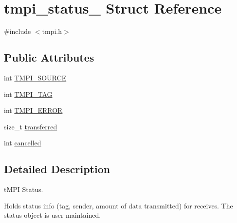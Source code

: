 \hypertarget{structtmpi__status__}{\section{tmpi\-\_\-status\-\_\- \-Struct \-Reference}
\label{structtmpi__status__}
}


{\ttfamily \#include $<$tmpi.\-h$>$}

\subsection*{\-Public \-Attributes}
\begin{DoxyCompactItemize}
\item 
int \hyperlink{structtmpi__status___a89d1e57918721cbd8f5f64c8620178f3}{\-T\-M\-P\-I\-\_\-\-S\-O\-U\-R\-C\-E}
\item 
int \hyperlink{structtmpi__status___ab3476d9d636c0a7f14678c59c92daa6d}{\-T\-M\-P\-I\-\_\-\-T\-A\-G}
\item 
int \hyperlink{structtmpi__status___a15f8a622a9943b094c8da7929af28710}{\-T\-M\-P\-I\-\_\-\-E\-R\-R\-O\-R}
\item 
size\-\_\-t \hyperlink{structtmpi__status___a7b767f29b335b6d832b36a43b21d9adf}{transferred}
\item 
int \hyperlink{structtmpi__status___afd58729d06a09f61d241dfe86222c6bc}{cancelled}
\end{DoxyCompactItemize}


\subsection{\-Detailed \-Description}
t\-M\-P\-I \-Status.

\-Holds status info (tag, sender, amount of data transmitted) for receives. \-The status object is user-\/maintained. 

